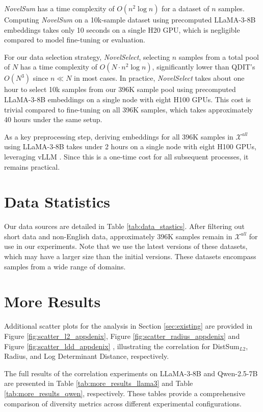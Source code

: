 \textit{NovelSum} has a time complexity of $O(n^2 \log n)$ for a dataset of $n$ samples. Computing \textit{NovelSum} on a 10k-sample dataset using precomputed LLaMA-3-8B embeddings takes only 10 seconds on a single H20 GPU, which is negligible compared to model fine-tuning or evaluation.  

For our data selection strategy, \textit{NovelSelect}, selecting $n$ samples from a total pool of $N$ has a time complexity of $O(N\cdot n^2 \log n)$, significantly lower than QDIT's $O(N^3)$ since $n \ll N$ in most cases. In practice, \textit{NovelSelect} takes about one hour to select 10k samples from our 396K sample pool using precomputed LLaMA-3-8B embeddings on a single node with eight H100 GPUs. This cost is trivial compared to fine-tuning on all 396K samples, which takes approximately 40 hours under the same setup.

As a key preprocessing step, deriving embeddings for all 396K samples in $\mathcal{X}^{all}$ using LLaMA-3-8B takes under 2 hours on a single node with eight H100 GPUs, leveraging vLLM \cite{kwon2023efficient}. Since this is a one-time cost for all subsequent processes, it remains practical.


\section{Data Statistics}

Our data sources are detailed in Table \ref{tab:data_stastics}. After filtering out short data and non-English data, approximately 396K samples remain in $\mathcal{X}^{all}$ for use in our experiments. Note that we use the latest versions of these datasets, which may have a larger size than the initial versions. These datasets encompass samples from a wide range of domains.

\section{More Results}
\label{app:results}
Additional scatter plots for the analysis in Section \ref{sec:existing} are provided in Figure \ref{fig:scatter_l2_appdenix}, Figure \ref{fig:scatter_radius_appdenix} and Figure \ref{fig:scatter_ldd_appdenix} , illustrating the correlation for DistSum$_{L2}$, Radius, and Log Determinant Distance, respectively.

The full results of the correlation experiments on LLaMA-3-8B and Qwen-2.5-7B are presented in Table \ref{tab:more_results_llama3} and Table \ref{tab:more_results_qwen}, respectively. These tables provide a comprehensive comparison of diversity metrics across different experimental configurations.





